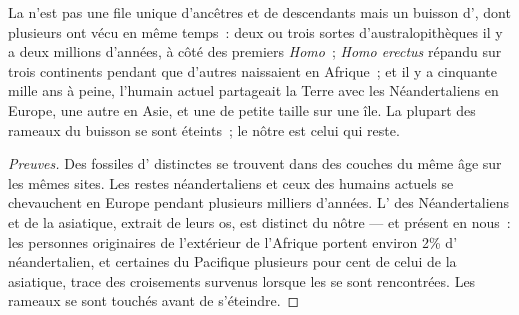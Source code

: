 \begin{proposition}\label{prop:g12:human-evolution:bush}
La  n'est pas une file unique d'ancêtres et de
descendants mais un buisson d', dont plusieurs ont vécu en même
temps~: deux ou trois sortes d'australopithèques il y a deux millions
d'années, à côté des premiers \emph{Homo}~; \emph{Homo erectus}
répandu sur trois continents pendant que d'autres  naissaient
en Afrique~; et il y a cinquante mille ans à peine, l'humain actuel
partageait la Terre avec les Néandertaliens en Europe, une autre
 en Asie, et une  de petite taille sur une île. La
plupart des rameaux du buisson se sont éteints~; le nôtre est celui
qui reste.
\end{proposition}
\begin{proof}[Preuves]
Des fossiles d' distinctes se trouvent dans des couches du même
âge sur les mêmes sites. Les restes néandertaliens et ceux des humains
actuels se chevauchent en Europe pendant plusieurs milliers d'années.
L' des Néandertaliens et de la  asiatique, extrait de
leurs os, est distinct du nôtre --- et présent en nous~: les personnes
originaires de l'extérieur de l'Afrique portent environ 2\% d'
néandertalien, et certaines  du Pacifique plusieurs pour
cent de celui de la  asiatique, trace des croisements
survenus lorsque les  se sont rencontrées. Les rameaux se sont
touchés avant de s'éteindre.
\end{proof}

